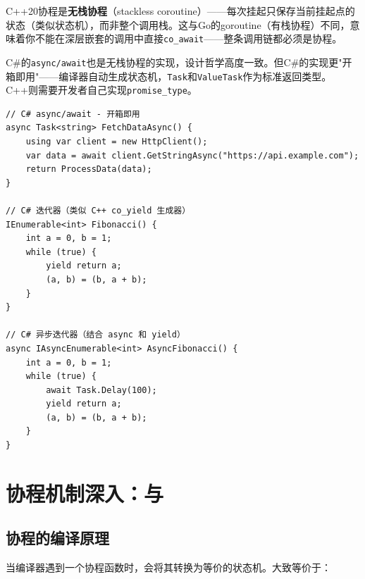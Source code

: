 \documentclass[12pt,a4paper,fontset=fandol]{ctexbook}
\newcommand{\cpp}[1]{C++#1}
\newcommand{\csharp}{C\#}
\begin{document}
\begin{note}
\cpp{}20协程是\textbf{无栈协程}（stackless coroutine）——每次挂起只保存当前挂起点的状态（类似状态机），而非整个调用栈。这与Go的goroutine（有栈协程）不同，意味着你不能在深层嵌套的调用中直接\texttt{co\_await}——整条调用链都必须是协程。
\end{note}

\begin{compare}
\csharp{}的\texttt{async/await}也是无栈协程的实现，设计哲学高度一致。但\csharp{}的实现更"开箱即用"——编译器自动生成状态机，\texttt{Task}和\texttt{ValueTask}作为标准返回类型。\cpp{}则需要开发者自己实现\texttt{promise\_type}。

\begin{lstlisting}[style=csharpstyle]
// C# async/await - 开箱即用
async Task<string> FetchDataAsync() {
    using var client = new HttpClient();
    var data = await client.GetStringAsync("https://api.example.com");
    return ProcessData(data);
}

// C# 迭代器（类似 C++ co_yield 生成器）
IEnumerable<int> Fibonacci() {
    int a = 0, b = 1;
    while (true) {
        yield return a;
        (a, b) = (b, a + b);
    }
}

// C# 异步迭代器（结合 async 和 yield）
async IAsyncEnumerable<int> AsyncFibonacci() {
    int a = 0, b = 1;
    while (true) {
        await Task.Delay(100);
        yield return a;
        (a, b) = (b, a + b);
    }
}
\end{lstlisting}
\end{compare}

\chapter[协程机制深入：\texttt{promise\_type}与\texttt{coroutine\_handle}]{协程机制深入：\texttt{}与\texttt{}}

\section{协程的编译原理}

当编译器遇到一个协程函数时，会将其转换为等价的状态机。大致等价于：
\end{document}
